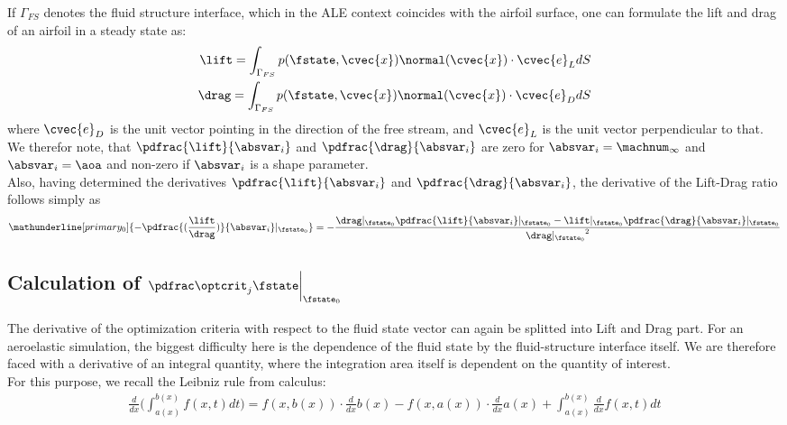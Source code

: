 \documentclass[../main.tex]{subfiles}
\begin{document}
If $\Gamma_{FS}$ denotes the fluid structure interface, which in the \ac{ALE} context coincides with the airfoil surface, one can formulate the lift and drag of an airfoil in a steady state as:
\begin{align}\label{eq:lift_and_drag_integrals}
\lift=\int_{\Gamma_{FS}} p(\fstate,\cvec{x}) \normal(\cvec{x})\cdot \cvec{e}_L dS \nonumber\\
\drag=\int_{\Gamma_{FS}} p(\fstate,\cvec{x}) \normal(\cvec{x})\cdot \cvec{e}_D dS \\
\end{align}
where $\cvec{e}_D$ is the unit vector pointing in the direction of the free stream, and $\cvec{e}_L$ is the unit vector perpendicular to that.
We therefor note, that $\pdfrac{\lift}{\absvar_i}$ and $\pdfrac{\drag}{\absvar_i}$ are zero for $\absvar_{i}=\machnum_{\infty}$ and $\absvar_{i}=\aoa$ and non-zero if $\absvar_{i}$ is a shape parameter.\\
Also, having determined the derivatives $\pdfrac{\lift}{\absvar_i}$ and $\pdfrac{\drag}{\absvar_i}$, the derivative of the Lift-Drag ratio follows simply as
\begin{align}\label{eq:lifttoddrag_by_absvar}
\mathunderline[primary_0]{-\pdfrac{(\frac{\lift}{\drag})}{\absvar_i}\rvert_{\fstate_0}}=
-\frac{\drag\rvert_{\fstate_0} \pdfrac{\lift}{\absvar_i}\rvert_{\fstate_0} - \lift\rvert_{\fstate_0} \pdfrac{\drag}{\absvar_i}\rvert_{\fstate_0} }{{\drag\rvert_{\fstate_0}}^2}
\end{align}


\subsection{Calculation of $\PoptcritJBYfstate\bigg\rvert_{\fstate_0}$}
The derivative of the optimization criteria with respect to the fluid state vector can again be splitted into Lift and Drag part.
For an aeroelastic simulation, the biggest difficulty here is the dependence of the fluid state by the fluid-structure interface itself.
We are therefore faced with a derivative of an integral quantity, where the integration area itself is dependent on the quantity of interest.\\
For this purpose, we recall the Leibniz rule from calculus:
\begin{align}\label{eq:leibnitz_rule}
\frac{d}{dx}\Big(\int_{a(x)}^{b(x)} f(x,t) dt \Big) =
f(x,b(x))\cdot \frac{d}{dx}b(x)-
f(x,a(x))\cdot \frac{d}{dx}a(x)+
\int_{a(x)}^{b(x)} \frac{d}{dx} f(x,t) dt
\end{align}
\end{document}
